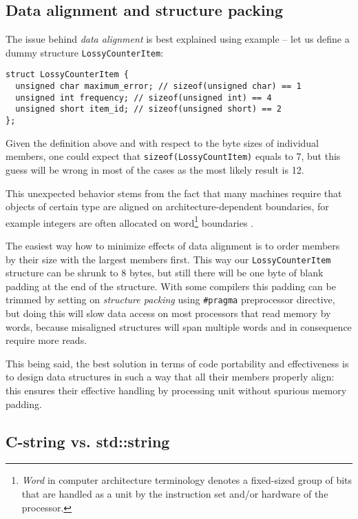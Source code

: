 \subsection{Data alignment and structure packing}

The issue behind \emph{data alignment} is best explained using example
-- let us define a dummy structure \verb|LossyCounterItem|:

\begin{verbatim}
struct LossyCounterItem {
  unsigned char maximum_error; // sizeof(unsigned char) == 1
  unsigned int frequency; // sizeof(unsigned int) == 4
  unsigned short item_id; // sizeof(unsigned short) == 2
};
\end{verbatim}

Given the definition above and with respect to the byte sizes of individual members,
one could expect that \verb|sizeof(LossyCountItem)| equals to 7, but this guess
will be wrong in most of the cases as the most likely result is 12.

This unexpected behavior stems from the fact that many machines require that
objects of certain type are aligned on architecture-dependent boundaries,
for example integers are often allocated on word\footnote{\emph{Word} in computer
architecture terminology denotes a fixed-sized group of bits that are handled
as a unit by the instruction  set and/or hardware of the processor.} boundaries
\citep[Chapter 5]{stroustrup:cplusplus}.

The easiest way how to minimize effects of data alignment is to order members
by their size with the largest members first.
This way our \verb|LossyCounterItem| structure can be shrunk to 8 bytes,
but still there will be one byte of blank padding at the end of the structure.
With some compilers this padding can be trimmed by setting on \emph{structure packing}
using \verb|#pragma| preprocessor directive, but doing this will slow data access
on most processors that read memory by words, because misaligned structures will span
multiple words and in consequence require more reads.

This being said, the best solution in terms of code portability and effectiveness
is to design data structures in such a way that all their members properly align:
this ensures their effective handling by processing unit without spurious memory padding.

\subsection{C-string vs. std::string}
\label{sec:strings}

